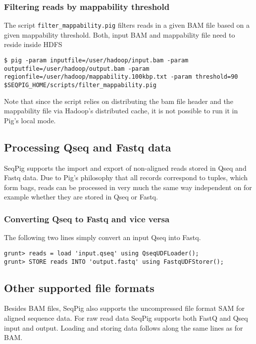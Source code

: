 \subsubsection{Filtering reads by mappability threshold}
The script {\tt filter\_mappability.pig} filters reads in a given BAM file based on a given
mappability threshold. Both, input BAM and mappability file need to reside inside HDFS
\begin{lstlisting}
$ pig -param inputfile=/user/hadoop/input.bam -param outputfile=/user/hadoop/output.bam -param regionfile=/user/hadoop/mappability.100kbp.txt -param threshold=90 $SEQPIG_HOME/scripts/filter_mappability.pig
\end{lstlisting}
Note that since the script relies on distributing the bam file header and the mappability file via Hadoop's distributed cache,
it is not possible to run it in Pig's local mode.

\subsection{Processing Qseq and Fastq data}

SeqPig supports the import and export of non-aligned reads stored in Qseq and
Fastq data. Due to Pig's philosophy that all records correspond to tuples, which
form bags, reads can be processed in very much the same way independent
on for example whether they are stored in Qseq or Fastq.

\subsubsection{Converting Qseq to Fastq and vice versa}

The following two lines simply convert an input Qseq into Fastq.
\begin{lstlisting}
grunt> reads = load 'input.qseq' using QseqUDFLoader();
grunt> STORE reads INTO 'output.fastq' using FastqUDFStorer(); 
\end{lstlisting}

\subsection{Other supported file formats}

Besides BAM files, SeqPig also supports the uncompressed file format SAM for
aligned sequence data. For raw read data SeqPig supports both FastQ and Qseq
input and output. Loading and storing data follows along the same lines as
for BAM.

